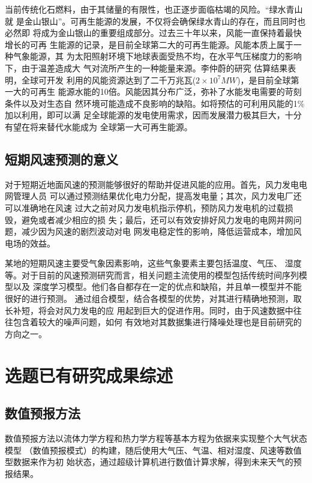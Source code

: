 \documentclass[AutoFakeBold]{LZUThesis}
\begin{document}
当前传统化石燃料，由于其储量的有限性，也正逐步面临枯竭的风险。“绿水青山就
是金山银山”。可再生能源的发展，不仅将会确保绿水青山的存在，而且同时也必然即
将成为金山银山的重要组成部分。过去三十年以来，风能一直保持着最快增长的可再
生能源的记录，是目前全球第二大的可再生能源。风能本质上属于一种气象能源，其
为太阳照射环境下地球表面受热不均，在水平气压梯度力的影响下，由于温差造成大
气对流所产生的一种能量来源。李仲蔚的研究
估算结果表明，全球可开发
利用的风能资源达到了二千万兆瓦($2\times10^7MW$)，是目前全球第一大的可再生
能源水能的10倍。风能因其分布广泛，弥补了水能发电需要的苛刻条件以及对生态自
然环境可能造成不良影响的缺陷。如将预估的可利用风能的1\%加以利用，即可以满
足全球能源的发电使用需求，因而发展潜力极其巨大，十分有望在将来替代水能成为
全球第一大可再生能源。

\subsection{短期风速预测的意义}
对于短期近地面风速的预测能够很好的帮助并促进风能的应用。首先，风力发电电网管理人员
可以通过预测结果优化电力分配，提高发电量；其次，风力发电厂还可以准确地在风速
过大之前对风力发电机指示停机，预防风力发电机的过载损毁，避免或者减少相应的损
失；最后，还可以有效安排好风力发电的电网并网问题，减少因为风速的剧烈波动对电
网发电稳定性的影响，降低运营成本，增加风电场的效益。

某地的短期风速主要受气象因素影响，这些气象要素主要包括温度、气压、
湿度等。对于目前的风速预测研究而言，相关问题主流使用的模型包括传统时间序列模型以及
深度学习模型。他们各自都存在一定的优点和缺陷，并且单一模型并不能很好的进行预测。
通过组合模型，结合各模型的优势，对其进行精确地预测，取长补短，将会对风力发电的应
用起到巨大的促进作用。同时，由于风速数据中往往包含着较大的噪声问题，如何
有效地对其数据集进行降噪处理也是目前研究的方向之一。

\section{选题已有研究成果综述}
\subsection{数值预报方法}
数值预报方法以流体力学方程和热力学方程等基本方程为依据来实现整个大气状态模型
（数值预报模式）的构建，随后使用大气压、气温、相对湿度、风速等数值型数据来作为初
始状态，通过超级计算机进行数值计算求解，得到未来天气的预报结果。
\end{document}
